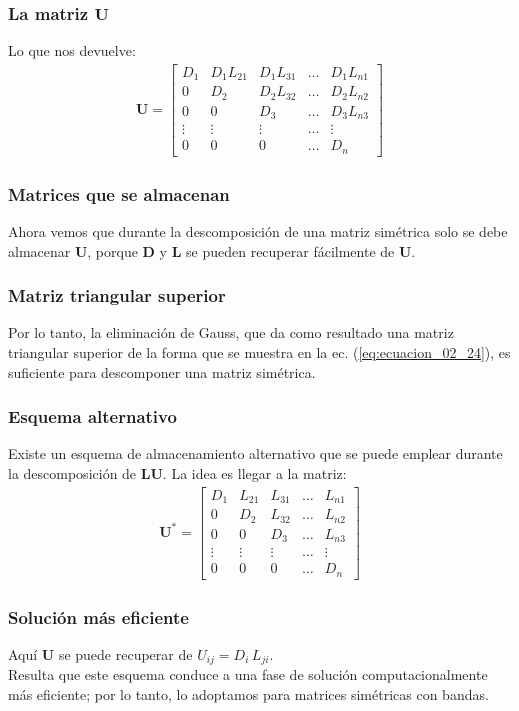 \documentclass[12pt]{beamer}
\begin{document}
\begin{frame}
\frametitle{La matriz $\mathbf{U}$}
Lo que nos devuelve:
\pause
\renewcommand{\arraystretch}{0.9}
\begin{align}
\mathbf{U} =
\begin{bmatrix}
D_{1} & D_{1} L_{21} & D_{1} L_{31} & \ldots & D_{1} L_{n1} \\
0 & D_{2} & D_{2} L_{32} & \ldots & D_{2} L_{n2} \\
0 & 0 & D_{3} & \ldots & D_{3} L_{n3} \\
\vdots & \vdots & \vdots & \ldots & \vdots \\
0 & 0 & 0 & \ldots & D_{n}
\end{bmatrix}
\label{eq:ecuacion_02_24}
\end{align}
\end{frame}
\begin{frame}
\frametitle{Matrices que se almacenan}
Ahora vemos que durante la descomposición de una matriz simétrica solo se debe almacenar $\mathbf{U}$, porque $\mathbf{D}$ y $\mathbf{L}$ se pueden recuperar fácilmente de $\mathbf{U}$.
\end{frame}
\begin{frame}
\frametitle{Matriz triangular superior}
Por lo tanto, la eliminación de Gauss, que da como resultado una matriz triangular superior de la forma que se muestra en la ec. (\ref{eq:ecuacion_02_24}), es suficiente para descomponer una matriz simétrica.
\end{frame}
\begin{frame}
\frametitle{Esquema alternativo}
Existe un esquema de almacenamiento alternativo que se puede emplear durante la descomposición de $\mathbf{LU}$. \pause La idea es llegar a la matriz:
\renewcommand{\arraystretch}{0.9}
\begin{align}
\mathbf{U}^{*} =
\begin{bmatrix}
D_{1} & L_{21} & L_{31} & \ldots & L_{n1} \\
0 & D_{2} & L_{32} & \ldots & L_{n2} \\
0 & 0 & D_{3} & \ldots & L_{n3} \\
\vdots & \vdots & \vdots & \ldots & \vdots \\
0 & 0 & 0 & \ldots & D_{n}
\end{bmatrix}
\label{eq:ecuacion_02_25}
\end{align}
\end{frame}
\begin{frame}
\frametitle{Solución más eficiente}
Aquí $\mathbf{U}$ se puede recuperar de $U_{ij} = D_{i} \, L_{ji}$.
\\
\bigskip
\pause
Resulta que este esquema conduce a una fase de solución computacionalmente más eficiente; \pause por lo tanto, lo adoptamos para matrices simétricas con bandas.
\end{frame}
\end{document}
